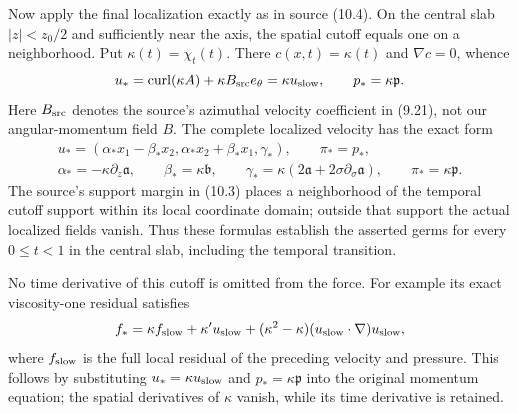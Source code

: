 Now apply the final localization exactly as in source (10.4).
On the central slab $|z|<z_0/2$ and sufficiently near the axis,
the spatial cutoff equals one on a neighborhood. Put
$\kappa(t)=\chi_t(t)$. There $c(x,t)=\kappa(t)$ and
$\nabla c=0$, whence
\[
 u_*=\operatorname{curl}(\kappa A)+\kappa B_{\rm src}e_\theta
     =\kappa u_{\rm slow},\qquad
 p_*=\kappa\mathfrak p .
\]
Here $B_{\rm src}$ denotes the source's azimuthal velocity
coefficient in (9.21), not our angular-momentum field $B$.
The complete localized velocity has the exact form
\begin{equation}
\begin{gathered}
 u_*=(\alpha_*x_1-\beta_*x_2,
       \alpha_*x_2+\beta_*x_1,\gamma_*),\qquad
 \pi_*=p_*,\\
 \alpha_*=-\kappa\partial_z\mathfrak a,\qquad
 \beta_*=\kappa\mathfrak b,\qquad
 \gamma_*=\kappa(2\mathfrak a+
                            2\sigma\partial_\sigma\mathfrak a),
 \qquad \pi_*=\kappa\mathfrak p .
\end{gathered}
 \label{eq:cq-actual-localized-all-velocity-coefficients}
\end{equation}
The source's support margin in (10.3) places a neighborhood of
the temporal cutoff support within its local coordinate domain;
outside that support the actual localized fields vanish. Thus
these formulas establish the asserted germs for every
$0\leq t<1$ in the central slab, including the temporal transition.

No time derivative of this cutoff is omitted from the force.
For example its exact viscosity-one residual satisfies
\[
 f_* =\kappa f_{\rm slow}
        +\kappa' u_{\rm slow}
        +(\kappa^2-\kappa)
                   (u_{\rm slow}\cdot\nabla)u_{\rm slow},
\]
where $f_{\rm slow}$ is the full local residual of the preceding
velocity and pressure. This follows by substituting
$u_* =\kappa u_{\rm slow}$ and $p_* =\kappa\mathfrak p$
into the original momentum equation; the spatial derivatives of
$\kappa$ vanish, while its time derivative is retained.

